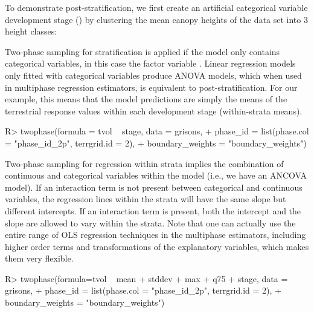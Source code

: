 \documentclass[article]{jss}
\begin{document}
To demonstrate post-stratification, we first create an artificial categorical variable development stage () by clustering the mean canopy heights of the  data set into 3 height classes:


\begin{Schunk}
\end{Schunk}


Two-phase sampling for stratification is applied if the model only contains categorical variables, in this case the factor variable . Linear regression models only fitted with categorical variables produce ANOVA models, which when used in multiphase regression estimators, is equivalent to post-stratification. For our example, this means that the model predictions are simply the means of the terrestrial response values within each development stage (within-strata means).


\begin{Schunk}
\begin{Sinput}
R> twophase(formula = tvol ~ stage, data = grisons, 
+    phase_id = list(phase.col = "phase_id_2p", terrgrid.id = 2),
+    boundary_weights = "boundary_weights")
\end{Sinput}
\end{Schunk}


Two-phase sampling for regression within strata implies the combination of continuous and categorical variables within the model (i.e., we have an ANCOVA model). If an interaction term is not present between categorical and continuous variables, the regression lines within the strata will have the same slope but different intercepts. If an interaction term is present, both the intercept and the slope are allowed to vary within the strata. Note that one can actually use the entire range of OLS regression techniques in the multiphase estimators, including higher order terms and transformations of the explanatory variables, which makes them very flexible.


\begin{Schunk}
\begin{Sinput}
R> twophase(formula=tvol ~ mean + stddev + max + q75 + stage, data = grisons,
+    phase_id = list(phase.col = "phase_id_2p", terrgrid.id = 2),
+    boundary_weights = "boundary_weights")
\end{Sinput}
\end{Schunk}
\end{document}
